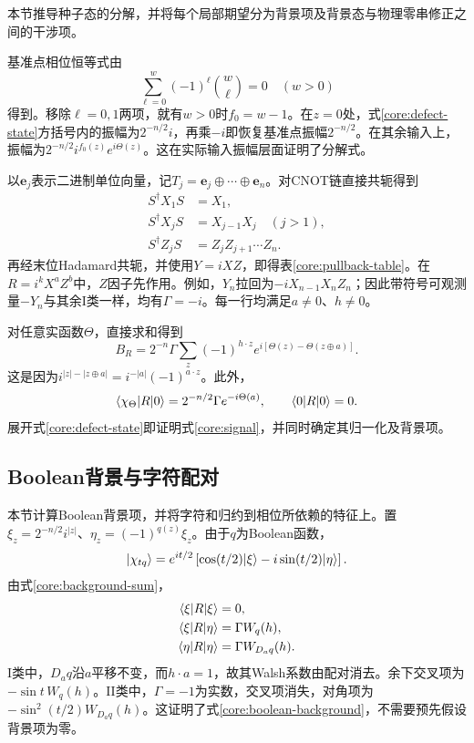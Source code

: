 本节推导种子态的分解，并将每个局部期望分为背景项及背景态与物理零串修正之间的干涉项。

基准点相位恒等式由
\begin{equation}
 \sum_{\ell=0}^{w}(-1)^\ell\binom w\ell=0\quad(w>0)
\end{equation}
得到。移除$\ell=0,1$两项，就有$w>0$时$f_0=w-1$。在$z=0$处，式\eqref{core:defect-state}方括号内的振幅为$2^{-n/2}i$，再乘$-i$即恢复基准点振幅$2^{-n/2}$。在其余输入上，振幅为$2^{-n/2}i^{f_0(z)}e^{i\Theta(z)}$。这在实际输入振幅层面证明了分解式。

以$\mathbf e_j$表示二进制单位向量，记$T_j=\mathbf e_j\oplus\cdots\oplus\mathbf e_n$。对CNOT链直接共轭得到
\begin{align}
 S^\dagger X_1S&=X_1,\nonumber\\
 S^\dagger X_jS&=X_{j-1}X_j\quad(j>1),\nonumber\\
 S^\dagger Z_jS&=Z_jZ_{j+1}\cdots Z_n.
 \label{core:cnot-pullbacks}
\end{align}
再经末位Hadamard共轭，并使用$Y=iXZ$，即得表\ref{core:pullback-table}。在$R=i^kX^aZ^b$中，$Z$因子先作用。例如，$Y_n$拉回为$-iX_{n-1}X_nZ_n$；因此带符号可观测量$-Y_n$与其余I类一样，均有$\Gamma=-i$。每一行均满足$a\ne0$、$h\ne0$。

对任意实函数$\Theta$，直接求和得到
\begin{equation}
 B_R=2^{-n}\Gamma\sum_z(-1)^{h\cdot z}
 e^{i[\Theta(z)-\Theta(z\oplus a)]}.
 \label{core:background-sum}
\end{equation}
这是因为$i^{|z|-|z\oplus a|}=i^{-|a|}(-1)^{a\cdot z}$。此外，
\begin{equation}
 \langle \chi_\Theta\rvert R\lvert 0\rangle
 =2^{-n/2}\Gamma e^{-i\Theta(a)},\qquad
 \langle 0\rvert R\lvert 0\rangle=0.
\end{equation}
展开式\eqref{core:defect-state}即证明式\eqref{core:signal}，并同时确定其归一化及背景项。



\subsection{Boolean背景与字符配对}
\label{core:pairing}

本节计算Boolean背景项，并将字符和归约到相位所依赖的特征上。置$\xi_z=2^{-n/2}i^{|z|}$、$\eta_z=(-1)^{q(z)}\xi_z$。由于$q$为Boolean函数，
\begin{equation}
 \lvert \chi_{tq}\rangle=e^{it/2}
 \left[\cos(t/2)\lvert \xi\rangle-i\sin(t/2)\lvert \eta\rangle\right].
\end{equation}
由式\eqref{core:background-sum}，
\begin{align}
 \langle \xi\rvert R\lvert \xi\rangle&=0,\nonumber\\
 \langle \xi\rvert R\lvert \eta\rangle&=\Gamma W_q(h),\nonumber\\
 \langle \eta\rvert R\lvert \eta\rangle&=\Gamma W_{D_aq}(h).
\end{align}
I类中，$D_aq$沿$a$平移不变，而$h\cdot a=1$，故其Walsh系数由配对消去。余下交叉项为$-\sin t\,W_q(h)$。II类中，$\Gamma=-1$为实数，交叉项消失，对角项为$-\sin^2(t/2)W_{D_aq}(h)$。这证明了式\eqref{core:boolean-background}，不需要预先假设背景项为零。

